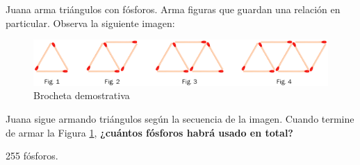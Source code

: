 \question[10] Juana arma triángulos con fósforos. Arma figuras que guardan una relación en particular. Observa la siguiente imagen:

\begin{minipage}{0.4\linewidth}
    \begin{figure}[H]
        \centering
        \includegraphics[width=0.9\linewidth]{../images/c9b918ae22f368bf3b8bbb644dfd20d4530338f0}
        \caption{Brocheta demostrativa}
        \label{fig:c9b918ae22f368bf3b8bbb644dfd20d4530338f0}
    \end{figure}
\end{minipage}\hfill
\begin{minipage}{0.6\linewidth}
    Juana sigue armando triángulos según la secuencia de la imagen.
    Cuando termine de armar la Figura \ref{fig:c9b918ae22f368bf3b8bbb644dfd20d4530338f0},
    \textbf{¿cuántos fósforos habrá usado en total?}

    \begin{solutionbox}{1.2cm}
        255 fósforos.
    \end{solutionbox}
\end{minipage}